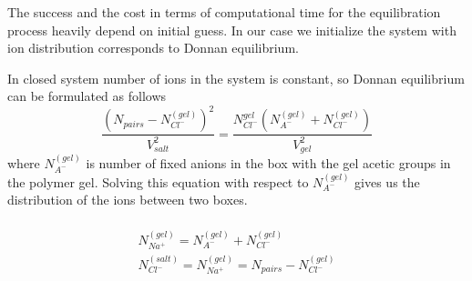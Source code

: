 \documentclass[journal=mamobx, layout=twocolumns,manuscript=article]{achemso}
\begin{document}
The success and the cost in terms of computational time for the equilibration process heavily depend on initial guess. In our case we initialize the system with ion distribution corresponds to Donnan equilibrium.

In closed system number of ions in the system is constant, so Donnan equilibrium can be formulated as follows
\begin{equation}
    \frac{\left(N_{pairs} - N_{Cl^{-}}^{(gel)}\right)^2}{V_{salt}^2} = \frac{N_{Cl^{-}}^{gel} (N^{{(gel)}}_{A^{-}} + N_{Cl^{-}}^{(gel)})}{V_{gel}^2}
\end{equation}
where $N^{{(gel)}}_{A^{-}}$ is number of fixed anions in the box with the gel \ie acetic groups in the polymer gel.
Solving this equation with respect to $N^{{(gel)}}_{A^{-}}$ gives us the distribution of the ions between two boxes.



\begin{eqnarray}
    \\
    N_{Na^{+}}^{(gel)} = N^{{(gel)}}_{A^{-}} + N_{Cl^{-}}^{(gel)}
    \\
    N_{Cl^{-}}^{(salt)} = N_{Na^{+}}^{(gel)} = N_{pairs} - N_{Cl^{-}}^{(gel)}
\end{eqnarray}
\end{document}
